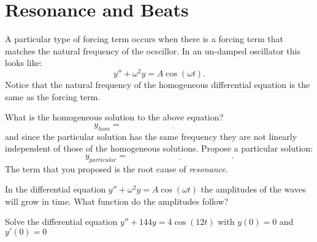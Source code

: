 \section{Resonance and Beats}
A particular type of forcing term occurs when there is a forcing term that matches the
natural frequency of the ocscillor.  In an un-damped oscillator this looks like:
\[ y'' + \omega^2 y = A \cos\left( \omega t \right). \]
Notice that the natural frequency of the homogeneous differential equation is the same as
the forcing term.  
\begin{problem}
    What is the homogeneous solution to the above equation?
    \[ y_{hom} = \underline{\hspace{2in}} \]
    and since the particular solution has the same frequency they are not linearly
    independent of those of the homogeneous solutions.  Propose a particular solution:
    \[ y_{particular} = \underline{\hspace{2in}}. \]
    The term that you proposed is the root cause of {\it resonance}.
\end{problem}

\begin{problem}
    In the differential equation $y'' + \omega^2 y = A \cos(\omega t)$ the amplitudes of
    the waves will grow in time.  What function do the amplitudes follow?
\end{problem}

\begin{problem}
    Solve the differential equation $y'' + 144y = 4 \cos(12t)$ with $y(0) = 0$ and
    $y'(0)=0$
\end{problem}

